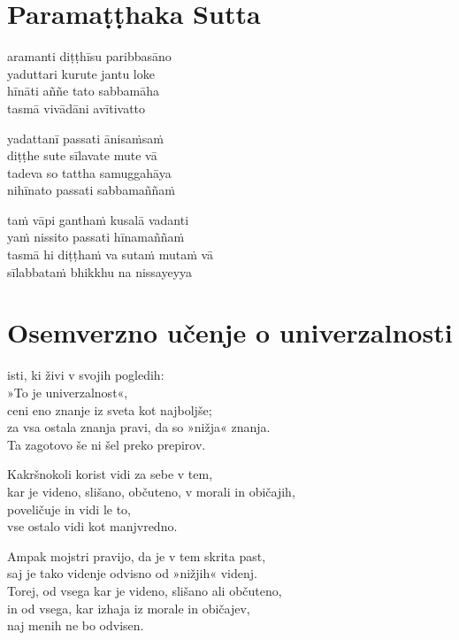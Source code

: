 

\cleartoverso
\chapter*{Paramaṭṭhaka Sutta}

aramanti diṭṭhīsu paribbasāno\\
yaduttari kurute jantu loke\\
hīnāti aññe tato sabbamāha\\
tasmā vivādāni avītivatto

yadattanī passati ānisaṁsaṁ\\
diṭṭhe sute sīlavate mute vā\\
tadeva so tattha samuggahāya\\
nihīnato passati sabbamaññaṁ

taṁ vāpi ganthaṁ kusalā vadanti\\
yaṁ nissito passati hīnamaññaṁ\\
tasmā hi diṭṭhaṁ va sutaṁ mutaṁ vā\\
sīlabbataṁ bhikkhu na nissayeyya


\cleartorecto
\chapter{Osemverzno učenje o univerzalnosti}

isti, ki živi v svojih pogledih:\\
»To je univerzalnost«,\\
ceni eno znanje iz sveta kot najboljše;\\
za vsa ostala znanja pravi, da so »nižja« znanja.\\
Ta zagotovo še ni šel preko prepirov.

Kakršnokoli korist vidi za sebe v tem,\\
kar je videno, slišano, občuteno, v morali in običajih,\\
poveličuje in vidi le to,\\
vse ostalo vidi kot manjvredno.

Ampak mojstri pravijo, da je v tem skrita past,\\
saj je tako videnje odvisno od »nižjih« videnj.\\
Torej, od vsega kar je videno, slišano ali občuteno,\\
in od vsega, kar izhaja iz morale in običajev,\\\vin naj menih ne bo odvisen.

